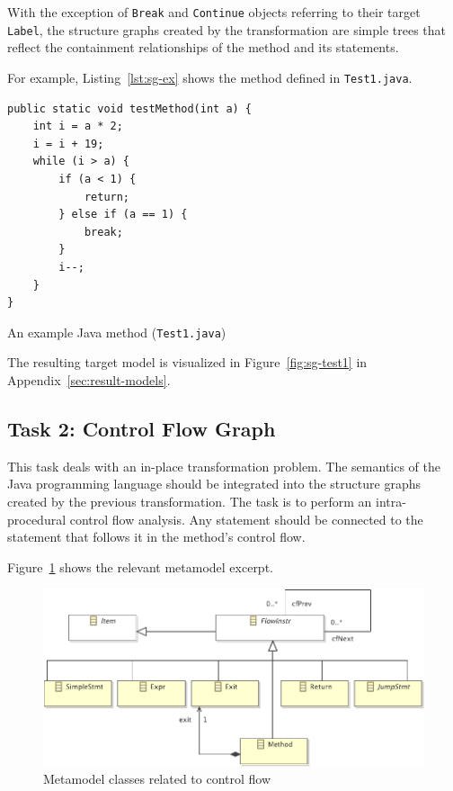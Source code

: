 \documentclass[11pt]{article}
\begin{document}
With the exception of \verb|Break| and \verb|Continue| objects referring to
their target \verb|Label|, the structure graphs created by the transformation
are simple trees that reflect the containment relationships of the method and
its statements.

For example, Listing~\ref{lst:sg-ex} shows the method defined in
\verb|Test1.java|.

\begin{listing}
  \begin{verbatim}
public static void testMethod(int a) {
    int i = a * 2;
    i = i + 19;
    while (i > a) {
        if (a < 1) {
            return;
        } else if (a == 1) {
            break;
        }
        i--;
    }
}
  \end{verbatim}
  \caption{An example Java method (\texttt{Test1.java})}
  \label{lst:sg-ex}
\end{listing}

The resulting target model is visualized in Figure~\ref{fig:sg-test1} in
Appendix~\ref{sec:result-models}.


\subsection{Task 2: Control Flow Graph}
\label{sec:task2-cf-graph}

This task deals with an in-place transformation problem.  The semantics of the
Java programming language should be integrated into the structure graphs
created by the previous transformation.  The task is to perform an
intra-procedural control flow analysis.  Any statement should be connected to
the statement that follows it in the method's control flow.

Figure~\ref{fig:control-flow-mm} shows the relevant metamodel excerpt.

\begin{figure}[h!]
  \centering
  \includegraphics[width=0.8\linewidth]{../metamodel/ControlFlowGraph}
  \caption{Metamodel classes related to control flow}
  \label{fig:control-flow-mm}
\end{figure}
\end{document}
